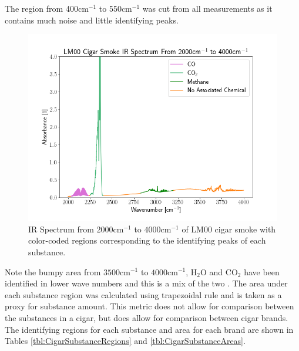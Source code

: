 \documentclass[reprint,amsmath,amssymb,aps, prl,superscriptaddress]{revtex4-2}
\begin{document}
The region from 400$\text{cm}^{-1}$ to 550$\text{cm}^{-1}$ was cut from all measurements as it contains much noise and little identifying peaks.
\begin{figure}[H]
    \includegraphics[width=\linewidth]{Images/Colored Cigar Spectrums/LM00_CO-CO2_Spectrum.png} 
    \caption{IR Spectrum from $2000 \text{cm}^{-1}$ to $4000 \text{cm}^{-1}$ of LM00 cigar smoke with color-coded regions corresponding to the identifying peaks of each substance.}
    \label{fig:COCO2LM}
\end{figure}
Note the bumpy area from $3500 \text{cm}^{-1}$ to $4000 \text{cm}^{-1}$, $\text{H}_{2}\text{O}$ and $\text{CO}_{2}$ have been identified in lower wave numbers and this is a mix of the two \cite{FTIRSPECTRAOFSMOKE}.
The area under each substance region was calculated using trapezoidal rule \cite{numerical} 
and is taken as a proxy for substance amount. This metric does not allow for comparison between the substances in a cigar, but does allow for comparison between cigar brands.
The identifying regions for each substance and area for each brand are shown in Tables \ref{tbl:CigarSubstanceRegions} and \ref{tbl:CigarSubstanceAreas}. %
\end{document}
